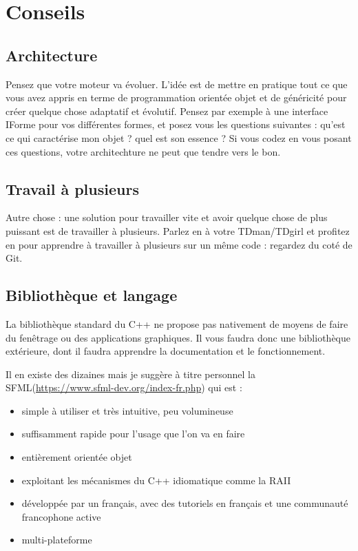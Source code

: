\documentclass[a4paper, 11pt]{article}
\begin{document}
\section*{Conseils}  
\subsection{Architecture}  
  
Pensez que votre moteur va évoluer. L'idée est de mettre en pratique tout ce que vous avez appris en terme de programmation orientée objet et de généricité pour créer quelque chose adaptatif et évolutif. Pensez par exemple à une interface IForme pour vos différentes formes, et posez vous les questions suivantes : qu'est ce qui caractérise mon objet ? quel est son essence ? Si vous codez en vous posant ces questions, votre architechture ne peut que tendre vers le bon.

\subsection{Travail à plusieurs}
Autre chose : une solution pour travailler vite et avoir quelque chose de plus puissant est de travailler à plusieurs. Parlez en à votre TDman/TDgirl et profitez en pour apprendre à travailler à plusieurs sur un même code : regardez du coté de Git.

\subsection{Bibliothèque et langage}  
  
La bibliothèque standard du C++ ne propose pas nativement de moyens de faire du fenêtrage ou des applications graphiques. Il vous faudra donc une bibliothèque extérieure, dont il faudra apprendre la documentation et le fonctionnement.

Il en existe des dizaines mais je suggère à titre personnel la SFML(\url{https://www.sfml-dev.org/index-fr.php}) qui est :  
  
\begin{itemize}
\item simple à utiliser et très intuitive, peu volumineuse
\item suffisamment rapide pour l'usage que l'on va en faire
\item entièrement orientée objet
\item exploitant les mécanismes du C++ idiomatique comme la RAII
\item développée par un français, avec des tutoriels en français et une communauté francophone active
\item multi-plateforme
\end{itemize}
\end{document}
